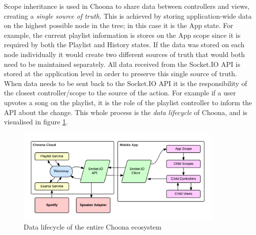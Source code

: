 Scope inheritance is used in Choona to share data between controllers and views, creating a \textit{single source of truth}. This is achieved by storing application-wide data on the highest possible node in the tree; in this case it is the App state. For example, the current playlist information is stores on the App scope since it is required by both the Playlist and History states. If the data was stored on each node individually it would create two different sources of truth that would both need to be maintained separately. All data received from the Socket.IO API is stored at the application level in order to preserve this single source of truth. When data needs to be sent back to the Socket.IO API it is the responsibility of the closest controller/scope to the source of the action. For example if a user upvotes a song on the playlist, it is the role of the playlist controller to inform the API about the change. This whole process is the \textit{data lifecycle} of Choona, and is visualised in figure \ref{fig:lifecycle}.

\begin{figure}[h!]
  \centering
  \includegraphics[width=0.9\textwidth]{./img/lifecycle.png}
  \caption{Data lifecycle of the entire Choona ecosystem}
  \label{fig:lifecycle}
\end{figure}